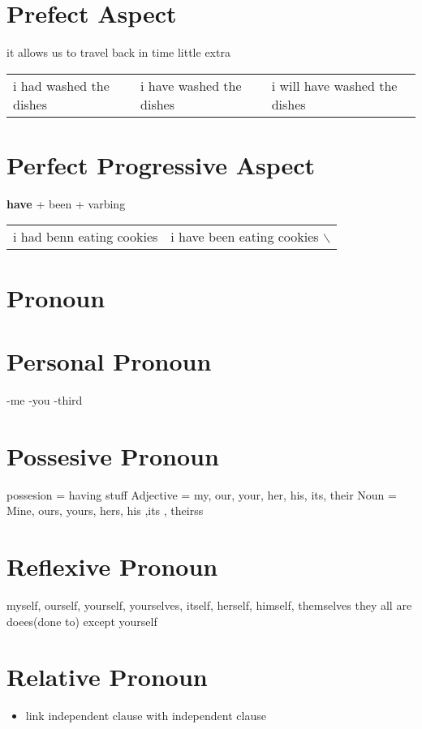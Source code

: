 \documentclass[11pt]{article}
\begin{document}
\section{Prefect Aspect}
\label{sec:org42a47ec}
it allows us to travel back in time little extra
\begin{center}
\begin{tabular}{lll}
i had washed the dishes & i have washed the dishes & i will have washed the dishes\\
\end{tabular}
\end{center}

\section{Perfect Progressive Aspect}
\label{sec:orgcff44fa}
\textbf{have} + been + varbing
\begin{center}
\begin{tabular}{ll}
i had benn eating cookies & i have been eating cookies $\backslash$\\
\end{tabular}
\end{center}
\section{Pronoun}
\label{sec:org13ef4ed}
\section{Personal Pronoun}
\label{sec:org9ed59fb}
-me -you -third
\section{Possesive Pronoun}
\label{sec:org43fc989}
possesion = having stuff
Adjective = my, our, your, her, his, its, their
Noun = Mine, ours, yours, hers, his ,its , theirss
\section{Reflexive Pronoun}
\label{sec:org088152e}
myself, ourself, yourself, yourselves, itself, herself, himself, themselves
they all are doees(done to) except yourself
\section{Relative Pronoun}
\label{sec:org0c3b441}
\begin{itemize}
\item link independent clause with independent clause
\end{itemize}
\end{document}
